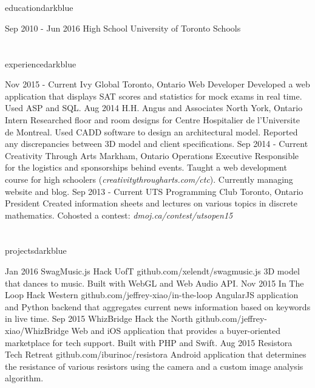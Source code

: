 \documentclass{resume}
\begin{document}
	\begin{main}
		\vspace{10pt}%
		\section{\faBook}{education}{darkblue}
			\begin{entrylist}
				\rightentry%
				{Sep 2010 - Jun 2016}%
				{High School}%
				{University of Toronto Schools}%
				{}{}
			\end{entrylist}
		\section{\faBriefcase}{experience}{darkblue}
			\begin{entrylist}
				\rightentry%
					{Nov 2015 - Current}%
					{Ivy Global}%
					{Toronto, Ontario}%
					{Web Developer}%
					{Developed a web application that displays SAT scores and statistics for mock exams in real time. Used ASP and SQL.}
				\rightentry%
					{Aug 2014}%
					{H.H. Angus and Associates}%
					{North York, Ontario}%
					{Intern}%
					{Researched floor and room designs for Centre Hospitalier de l'Universite de Montreal. Used CADD software to design an architectural model. Reported any discrepancies between 3D model and client specifications.}
				\rightentry%
					{Sep 2014 - Current}%
					{Creativity Through Arts}%
					{Markham, Ontario}%
					{Operations Executive}%
					{Responsible for the logistics and sponsorships behind events. Taught a web development course for high schoolers (\emph{creativitythrougharts.com/ctc}). Currently managing website and blog.}
				\rightentry%
					{Sep 2013 - Current}%
					{UTS Programming Club}%
					{Toronto, Ontario}%
					{President}%
					{Created information sheets and lectures on various topics in discrete mathematics. Cohosted a contest: \emph{dmoj.ca/contest/utsopen15}}
			\end{entrylist}
		\section{\faFolder}{projects}{darkblue}
			\begin{entrylist}
				\rightentry%
					{Jan 2016}%
					{SwagMusic.js}%
					{Hack UofT}%
					{github.com/xelendt/swagmusic.js}%
					{3D model that dances to music. Built with WebGL and Web Audio API.}
				\rightentry%
					{Nov 2015}%
					{In The Loop}%
					{Hack Western}%
					{github.com/jeffrey-xiao/in-the-loop}%
					{AngularJS application and Python backend that aggregates current news information based on keywords in live time.}
				\rightentry%
					{Sep 2015}%
					{WhizBridge}%
					{Hack the North}%
					{github.com/jeffrey-xiao/WhizBridge}%
					{Web and iOS application that provides a buyer-oriented marketplace for tech support. Built with PHP and Swift.}
				\rightentry%
					{Aug 2015}%
					{Resistora}%
					{Tech Retreat}%
					{github.com/iburinoc/resistora}%
					{Android application that determines the resistance of various resistors using the camera and a custom image analysis algorithm.}
			\end{entrylist}	
	\end{main}
\end{document}
